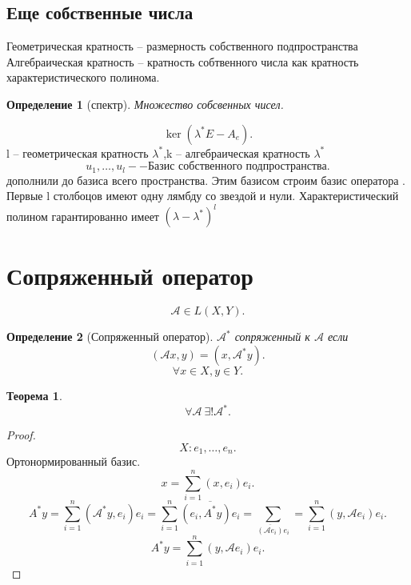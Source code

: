 \documentclass{scrartcl}
\newtheorem{theorem}{Теорема}
\newtheorem{definition}{Определение}
\begin{document}
\subsection{Еще собственные числа}
Геометрическая кратность -- размерность собственного подпространства\\
Алгебраическая кратность -- кратность собтвенного числа как кратность характеристического полинома.
\begin{definition}[спектр]
    Множество собсвенных чисел.
\end{definition}
\[
    \ker{( \lambda^{*} E - A_{e} )}
.\] 
l -- геометрическая кратность $\lambda^*$,k -- алгебраическая кратность  $\lambda^{*}$
\[
    u_1,\dots,u_{l} -- \text{Базис собственного подпространства}
.\] 
дополнили до базиса всего пространства. Этим базисом строим базис оператора
.
Первые l столбоцов имеют одну лямбду со звездой и нули. Характеристический полином гарантированно имеет $(\lambda - \lambda^{*})^{l}$
\section{Сопряженный оператор}
\[
    \mathcal{A} \in L(X,Y)
.\] 
\begin{definition}[Сопряженный оператор]
    $\mathcal{A}^{*}$ сопряженный к $\mathcal{A}$ если
     \[
         (\mathcal{A}x,y) = (x,\mathcal{A}^{*}y)
    .\] 
    \[
    \forall  x \in X ,y\in Y
    .\] 
\end{definition}
\begin{theorem}
    \[
        \forall  \mathcal{A} ~ \exists ! \mathcal{A}^{*}
    .\] 
\end{theorem}
\begin{proof}
    \[
    X: e_1,\dots,e_{n}
    .\] 
    Ортонормированный базис.
    \[
        x = \sum_{i = 1}^{n} (x,e_{i}) e_{i}
    .\] 
    \[
        A^{*}y = \sum_{i = 1}^{n} (\mathcal{A}^{*} y ,e_{i}) e_{i}=
        \sum_{i = 1}^{n} \overline{(e_{i},A^{*}y) e_{i}} = \sum_{\overline{(\mathcal{A} e_{i})} e_{i}} = \sum_{i = 1}^{n} (y,\mathcal{A} e_{i})e_{i}
    .\] 
    \[
    A^{*}y = \sum_{i = 1}^{n} (y,\mathcal{A} e_{i})e_{i}
    .\] 
\end{proof}
\end{document}

